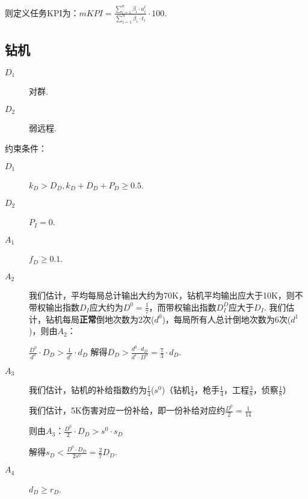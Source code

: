 \documentclass{ctexart}
\begin{document}
则定义任务KPI为：$mKPI = \frac{\sum_{i = 1}^{n} \beta_i \cdot a_i^t}{\sum_{i = 1}^{n} \beta_i \cdot t_i} \cdot 100$.

\subsection{钻机}

\begin{description}
    \item[$D_1$] 对群\cite{tieba-all}.
    \item[$D_2$] 弱远程.
\end{description}

约束条件：

\begin{description}
    \item[$D_1$] $k_D > D_D, k_D + D_D + P_D \ge 0.5$.
    \item[$D_2$] $P_I = 0$.
    \item[$A_1$] $f_D \ge 0.1$.
    \item[$A_2$]  我们估计，平均每局总计输出大约为70K，钻机平均输出应大于10K，则不带权输出指数$D_I$应大约为$D^0 = \frac{1}{7}$，而带权输出指数$D^D_I$应大于$D_I$. 我们估计，钻机每局\textbf{正常}倒地次数为2次($d^0$)，每局所有人总计倒地次数为6次($d^1$)，则由$A_2$：

          $\frac{D^0}{d^0} \cdot D_D> \frac{1}{d^1} \cdot d_D$
          解得$D_D > \frac{d^0 \cdot d_D}{d^1 \cdot D^0} = \frac{7}{3} \cdot d_D$.
    \item[$A_3$] 我们估计，钻机的补给指数约为$\frac{1}{4}$($s^0$)（钻机$\frac{1}{4}$，枪手$\frac{1}{4}$，工程$\frac{3}{8}$，侦察$\frac{1}{8}$）

          我们估计，5K伤害对应一份补给，即一份补给对应约$\frac{D^0}{2} = \frac{1}{14}$

          则由$A_3$：$\frac{D^0}{2} \cdot D_D > s^0 \cdot s_D$

          解得$s_D < \frac{D^0 \cdot D_D}{2 s^0} = \frac{2}{7} D_D$.

    \item[$A_4$] $d_D \ge r_D$.
\end{description}
\end{document}

